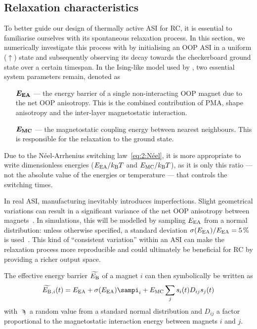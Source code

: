 \subsection{Relaxation characteristics}
\label{sec:3:relaxation}
To better guide our design of thermally active ASI for RC, it is essential to familiarise ourselves with its spontaneous relaxation process.
In this section, we numerically investigate this process with \hotspice by initialising an OOP ASI in a uniform ($\uparrow$) state and subsequently observing its decay towards the checkerboard ground state over a certain timespan.
In the Ising-like model used by \hotspice, two essential system parameters remain, denoted as
\begin{itemize}[leftmargin=4.1em]
	\item[$\boldsymbol{E_\mathrm{EA}}$ ---] the energy barrier of a single non-interacting OOP magnet due to the net OOP anisotropy.
	This is the combined contribution of PMA, shape anisotropy and the inter-layer magnetostatic interaction.
	\item[$\boldsymbol{E_\mathrm{MC}}$ ---] the magnetostatic coupling energy between nearest neighbours.
	This is responsible for the relaxation to the ground state.
\end{itemize}
Due to the N\'eel-Arrhenius switching law~\eqref{eq:2:Néel}, it is more appropriate to write dimensionless energies ($\EEA/\kBT$ and $\EMC/\kBT$), as it is only this ratio --- not the absolute value of the energies or temperature --- that controls the switching times. \par
In real ASI, manufacturing inevitably introduces imperfections.
Slight geometrical variations can result in a significant variance of the net OOP anisotropy between magnets~\cite{Budrikis2012,DisorderGroundStateASI}.
In simulations, this will be modelled by sampling $E_\mathrm{EA}$ from a normal distribution: unless otherwise specified, a standard deviation $\sigma(E_\mathrm{EA})/E_\mathrm{EA} = \SI{5}{\percent}$ is used~\cite{Farhan2013}.
This kind of ``consistent variation'' within an ASI can make the relaxation process more reproducible and could ultimately be beneficial for RC by providing a richer output space. \par
The effective energy barrier $\widetilde{E_\mathrm{B}}$ of a magnet $i$ can then symbolically be written as
\begin{equation}
	\label{eq:3:OOP_relaxation_EBeff}
	\EBeff{}_{,i}(t) = \EEA + \sigma(\EEA) \sampi_i + \EMC \sum_j s_i(t) D_{ij} s_j(t)
\end{equation}
with $\sampi$ a random value from a standard normal distribution and $D_{ij}$ a factor proportional to the magnetostatic interaction energy between magnets $i$ and $j$. \\\par

